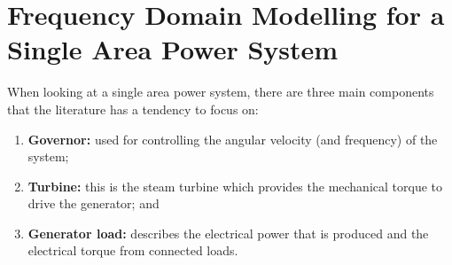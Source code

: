 \chapter{Frequency Domain Modelling for a Single Area Power System}
When looking at a single area power system, there are three main components that the literature has a tendency to focus on:
\begin{enumerate}
	\item \textbf{Governor:} used for controlling the angular velocity (and frequency) of the system;
	\item \textbf{Turbine:} this is the steam turbine which provides the mechanical torque to drive the generator; and
	\item \textbf{Generator load:} describes the electrical power that is produced and the electrical torque from connected loads. 
\end{enumerate}





